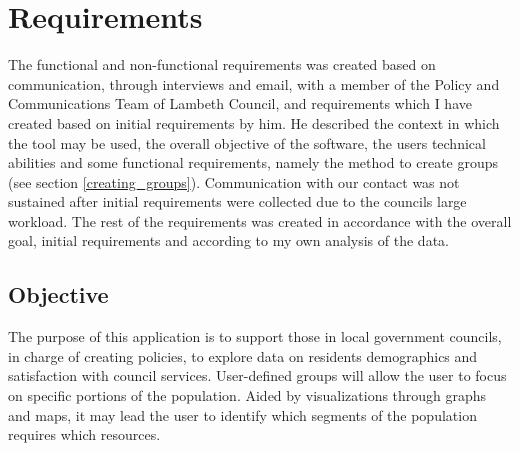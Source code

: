 \chapter{Requirements} \label{ch:requirements}

The functional and non-functional requirements was created based on communication, through interviews and email, with a member of the Policy and Communications Team of Lambeth Council, and requirements which I have created based on initial requirements by him. He described the context in which the tool may be used, the overall objective of the software, the users\textsc{} technical abilities and some functional requirements, namely the method to create groups (see section \ref{creating_groups}). Communication with our contact was not sustained after initial requirements were collected due to the council\textquotesingle s large workload. The rest of the requirements was created in accordance with the overall goal, initial requirements and according to my own analysis of the data.

\section{Objective}
The purpose of this application is to support those in local government councils, in charge of creating policies, to explore data on residents demographics and satisfaction with council services. User-defined groups will allow the user to focus on specific portions of the population. Aided by visualizations through graphs and maps, it may lead the user to identify which segments of the population requires which resources.

